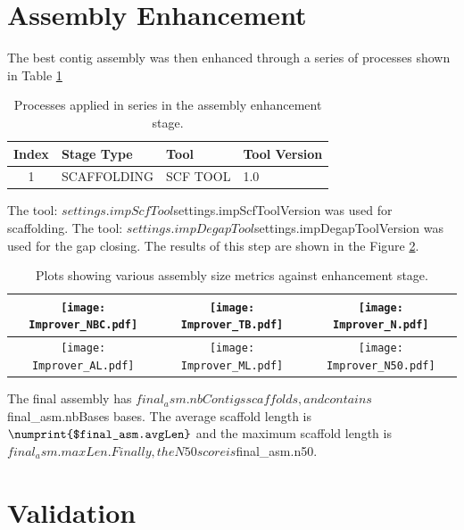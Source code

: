\documentclass{amsart}
\begin{document}
\newpage
\section{Assembly Enhancement}

The best contig assembly was then enhanced through a series of processes shown in Table \ref{tab:enhancingSteps}

\begin{table}[H]
\begin{center}
\begin{tabular}{clll}
\toprule
Index & Stage Type & Tool & Tool Version \\ \midrule
1 & SCAFFOLDING & SCF TOOL & 1.0 \\
\bottomrule
\end{tabular}
\end{center}
\caption{Processes applied in series in the assembly enhancement stage.}
\label{tab:enhancingSteps}
\end{table}


The tool: $settings.impScfTool $settings.impScfToolVersion was used for scaffolding.  The tool: $settings.impDegapTool $settings.impDegapToolVersion was used for the gap closing. The results of this step are shown in the Figure \ref{fig:scaffold_assembly_graphs}.


\begin{table}[H]
\begin{center}
\begin{tabular}{c|c|c}
\texttt{[image: Improver\_NBC.pdf]} & \texttt{[image: Improver\_TB.pdf]} & \texttt{[image: Improver\_N.pdf]}\\ \midrule 
\texttt{[image: Improver\_AL.pdf]} & \texttt{[image: Improver\_ML.pdf]} & \texttt{[image: Improver\_N50.pdf]} 
\end{tabular}
\end{center}
\caption{Plots showing various assembly size metrics against enhancement stage.}
\label{fig:scaffold_assembly_graphs}
\end{table}

The final assembly has $final_asm.nbContigs scaffolds, and contains $final_asm.nbBases bases.  The average scaffold length is $\numprint{$final_asm.avgLen}$ \npnoround and the maximum scaffold length is $final_asm.maxLen.  Finally, the N50 score is $final_asm.n50.


\newpage
\section{Validation}
\end{document}

